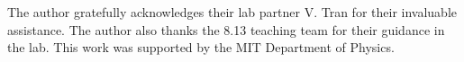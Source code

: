 \begin{acknowledgments} The author gratefully acknowledges their lab partner V. Tran for their invaluable assistance. The author also thanks the 8.13 teaching team for their guidance in the lab. This work was supported by the MIT Department of Physics. 
\end{acknowledgments}

% 
% 


